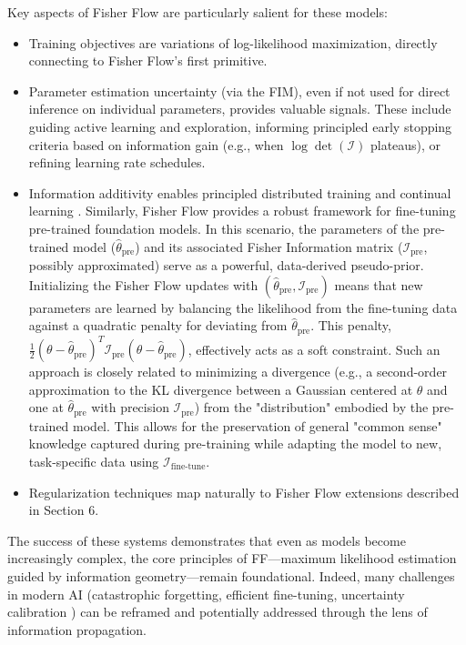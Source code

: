 \documentclass[11pt]{article}
\begin{document}
Key aspects of Fisher Flow are particularly salient for these models:
\begin{itemize}
\item Training objectives are variations of log-likelihood maximization, directly connecting to Fisher Flow's first primitive.
\item Parameter estimation uncertainty (via the FIM), even if not used for direct inference on individual parameters, provides valuable signals. These include guiding active learning \cite{settles2009active} and exploration, informing principled early stopping criteria based on information gain (e.g., when $\log\det(\mathcal{I})$ plateaus), or refining learning rate schedules.
\item Information additivity enables principled distributed training and continual learning \cite{kirkpatrick2017overcoming, parisi2019continual}. Similarly, Fisher Flow provides a robust framework for fine-tuning pre-trained foundation models. In this scenario, the parameters of the pre-trained model ($\hat{\theta}_{\text{pre}}$) and its associated Fisher Information matrix ($\mathcal{I}_{\text{pre}}$, possibly approximated) serve as a powerful, data-derived pseudo-prior. Initializing the Fisher Flow updates with $(\hat{\theta}_{\text{pre}}, \mathcal{I}_{\text{pre}})$ means that new parameters are learned by balancing the likelihood from the fine-tuning data against a quadratic penalty for deviating from $\hat{\theta}_{\text{pre}}$. This penalty, $\frac{1}{2} (\theta - \hat{\theta}_{\text{pre}})^T \mathcal{I}_{\text{pre}} (\theta - \hat{\theta}_{\text{pre}})$, effectively acts as a soft constraint. Such an approach is closely related to minimizing a divergence (e.g., a second-order approximation to the KL divergence between a Gaussian centered at $\theta$ and one at $\hat{\theta}_{\text{pre}}$ with precision $\mathcal{I}_{\text{pre}}$) from the "distribution" embodied by the pre-trained model. This allows for the preservation of general "common sense" knowledge captured during pre-training while adapting the model to new, task-specific data using $\mathcal{I}_{\text{fine-tune}}$.
\item Regularization techniques map naturally to Fisher Flow extensions described in Section 6.
\end{itemize}

The success of these systems demonstrates that even as models become increasingly complex, the core principles of FF---maximum likelihood estimation guided by information geometry---remain foundational. Indeed, many challenges in modern AI (catastrophic forgetting, efficient fine-tuning, uncertainty calibration \cite{guo2017calibration}) can be reframed and potentially addressed through the lens of information propagation.
\end{document}
